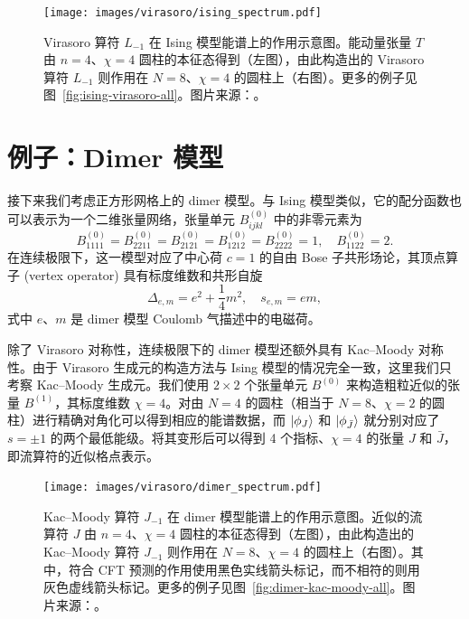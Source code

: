 \begin{figure}[ht]
  \centering
  \texttt{[image: images/virasoro/ising\_spectrum.pdf]}
  \caption[Virasoro 算符在 Ising 模型能谱上的作用示意图]{Virasoro 算符 $L_{-1}$ 在 Ising 模型能谱上的作用示意图。能动量张量 $T$ 由 $n=4$、$\chi=4$ 圆柱的本征态得到（左图），由此构造出的 Virasoro 算符 $L_{-1}$ 则作用在 $N=8$、$\chi=4$ 的圆柱上（右图）。更多的例子见图~\ref{fig:ising-virasoro-all}。图片来源：\parencite{wang2022virasoro}。}
  \label{fig:ising-virasoro}
\end{figure}

\section{例子：Dimer 模型}

接下来我们考虑正方形网格上的 dimer 模型\cite{kasteleyn1961statistics,temperley1961dimer,kasteleyn1963dimer}。与 Ising 模型类似，它的配分函数也可以表示为一个二维张量网络，张量单元 $B^{(0)}_{ijkl}$ 中的非零元素为
\begin{equation}
  B^{(0)}_{1111} = B^{(0)}_{2211} = B^{(0)}_{2121} = B^{(0)}_{1212} = B^{(0)}_{2222} = 1, \quad
  B^{(0)}_{1122} = 2.
\end{equation}
在连续极限下，这一模型对应了中心荷 $c=1$ 的自由 Bose 子共形场论\cite{ioffe1989superconductivity,henley1997relaxation,allegra2015exact}，其顶点算子 (vertex operator) 具有标度维数和共形自旋
\begin{equation}
  \Delta_{e,m} = e^2 + \frac14 m^2, \quad
  s_{e,m} = em,
\end{equation}
式中 $e$、$m$ 是 dimer 模型 Coulomb 气描述中的电磁荷。

除了 Virasoro 对称性，连续极限下的 dimer 模型还额外具有 Kac--Moody 对称性。由于 Virasoro 生成元的构造方法与 Ising 模型的情况完全一致，这里我们只考察 Kac--Moody 生成元。我们使用 $2\times2$ 个张量单元 $B^{(0)}$ 来构造粗粒近似的张量 $B^{(1)}$，其标度维数 $\chi=4$。对由 $N=4$ 的圆柱（相当于 $N=8$、$\chi=2$ 的圆柱）进行精确对角化可以得到相应的能谱数据，而 $\ket*{\phi_J}$ 和 $\ket*{\phi_{\bar{J}}}$ 就分别对应了 $s=\pm1$ 的两个最低能级。将其变形后可以得到 4 个指标、$\chi=4$ 的张量 $J$ 和 $\bar{J}$，即流算符的近似格点表示。

\begin{figure}[ht]
  \centering
  \texttt{[image: images/virasoro/dimer\_spectrum.pdf]}
  \caption[Kac--Moody 算符在 dimer 模型能谱上的作用示意图]{Kac--Moody 算符 $J_{-1}$ 在 dimer 模型能谱上的作用示意图。近似的流算符 $J$ 由 $n=4$、$\chi=4$ 圆柱的本征态得到（左图），由此构造出的 Kac--Moody 算符 $J_{-1}$ 则作用在 $N=8$、$\chi=4$ 的圆柱上（右图）。其中，符合 CFT 预测的作用使用黑色实线箭头标记，而不相符的则用灰色虚线箭头标记。更多的例子见图~\ref{fig:dimer-kac-moody-all}。图片来源：\parencite{wang2022virasoro}。}
  \label{fig:dimer-kac-moody}
\end{figure}

